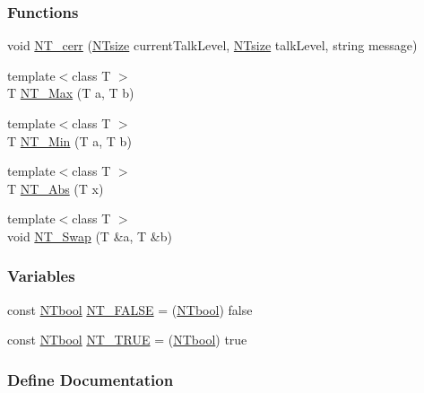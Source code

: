 \subsubsection*{Functions}
\begin{DoxyCompactItemize}
\item 
void \hyperlink{nt__types_8h_ab6edc13aefc4f170dee0f867a46c1c64}{NT\_\-cerr} (\hyperlink{nt__types_8h_a06c124f2e4469769b58230253ce0560b}{NTsize} currentTalkLevel, \hyperlink{nt__types_8h_a06c124f2e4469769b58230253ce0560b}{NTsize} talkLevel, string message)
\item 
{\footnotesize template$<$class T $>$ }\\T \hyperlink{nt__types_8h_a7cfc95266ff0012b0210fbce9b6f987a}{NT\_\-Max} (T a, T b)
\item 
{\footnotesize template$<$class T $>$ }\\T \hyperlink{nt__types_8h_a82b9824857b6c50fc14a216f4d3280fe}{NT\_\-Min} (T a, T b)
\item 
{\footnotesize template$<$class T $>$ }\\T \hyperlink{nt__types_8h_a4661a8297c17f78d910eec9050052c77}{NT\_\-Abs} (T x)
\item 
{\footnotesize template$<$class T $>$ }\\void \hyperlink{nt__types_8h_ae4e82c67d7541897b4e9fe720ac590a9}{NT\_\-Swap} (T \&a, T \&b)
\end{DoxyCompactItemize}
\subsubsection*{Variables}
\begin{DoxyCompactItemize}
\item 
const \hyperlink{nt__types_8h_a9f3200824a52174bb5be77bed3838822}{NTbool} \hyperlink{nt__types_8h_a863b3b4d84c0f1cfc274fa5a5a186e97}{NT\_\-FALSE} = (\hyperlink{nt__types_8h_a9f3200824a52174bb5be77bed3838822}{NTbool}) false
\item 
const \hyperlink{nt__types_8h_a9f3200824a52174bb5be77bed3838822}{NTbool} \hyperlink{nt__types_8h_a2016889a74e7f2b5e1ff959bbc3f0cb1}{NT\_\-TRUE} = (\hyperlink{nt__types_8h_a9f3200824a52174bb5be77bed3838822}{NTbool}) true
\end{DoxyCompactItemize}


\subsubsection{Define Documentation}
